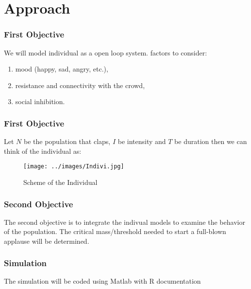 \documentclass[compress,handout,10pt]{beamer}
\let\olditem\item
\renewcommand{\item}{\setlength{\itemsep}{0.5\baselineskip}\olditem}
\begin{document}
\section{Approach}
\begin{frame}
\frametitle{First Objective}
We will model individual as a open loop system.\newline{} factors to consider: \newline
	\begin{enumerate}
		\item mood (happy, sad, angry, etc.),\newline \newline
		\item resistance and connectivity with the crowd,\newline\newline
		\item social inhibition.		
	\end{enumerate}
\end{frame}

\begin{frame}
\frametitle{First Objective}
Let $N$ be the population that claps, $I$ be intensity and $T$ be duration then we can think of the individual as:\newline\newline\newline

\begin{figure}[h]
    \begin{center}
        \texttt{[image: ../images/Indivi.jpg]}
    \end{center}
    \caption{Scheme of the Individual}
    \label{fig:individual}
\end{figure}

\end{frame}

\begin{frame}
\frametitle{Second Objective}
The second objective is to integrate the indivual models to examine the behavior of the population.\newline \newline
The critical mass/threshold needed to start a full-blown applause will be determined.
\end{frame}

\begin{frame}
\frametitle{Simulation}
The simulation will be coded using Matlab with R documentation 
\end{frame}
\end{document}
